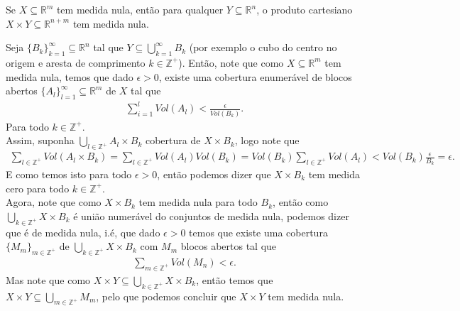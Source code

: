 \begin{homeworkProblem}[Seção 2-1]
  Se $X\subseteq \mathbb{R}^{m}$ tem medida nula, então para qualquer $Y\subseteq \mathbb{R}^{n}$, o produto cartesiano $X\times Y\subseteq \mathbb{R}^{n+m}$ tem medida nula. 
  \begin{solution}
    Seja $\{B_{k}\}_{k=1}^{\infty}\subseteq\mathbb{R}^{n}$ tal que $Y\subseteq \bigcup_{k=1}^{\infty}B_{k}$ (por exemplo o cubo do centro no origem e aresta de comprimento $k\in\mathbb{Z}^{+}$). Então, note que como $X\subseteq\mathbb{R}^{m}$ tem medida nula, temos que dado $\epsilon>0$, existe uma cobertura enumerável de blocos abertos $\{A_{l}\}_{l=1}^{\infty}\subseteq\mathbb{R}^{m}$ de $X$ tal que
    \begin{align*}
      \sum_{i=1}^{l}Vol(A_l)<\frac{\epsilon}{Vol(B_k)}.
    \end{align*}
    Para todo $k\in\mathbb{Z}^{+}$.\\
    Assim, suponha $\bigcup_{l\in\mathbb{Z}^{+}}A_l \times B_{k}$ cobertura de $X\times B_{k}$, logo note que
    \begin{align*}
      \sum_{l\in\mathbb{Z}^{+}}Vol(A_l\times B_k)=\sum_{l\in\mathbb{Z}^{+}}Vol(A_l)Vol(B_k)=Vol(B_k)\sum_{l\in\mathbb{Z}^{+}}Vol(A_l)<Vol(B_k)\frac{\epsilon}{B_k}=\epsilon.
    \end{align*}
    E como temos isto para todo $\epsilon>0$, então podemos dizer que $X\times B_k$ tem medida cero para todo $k\in\mathbb{Z}^{+}$.\\
    Agora, note que como $X\times B_{k}$ tem medida nula para todo $B_{k}$, então como $\bigcup_{k\in\mathbb{Z}^{+}}X\times B_k$ é união numerável do conjuntos de medida nula, podemos dizer que é de medida nula, i.é, que dado $\epsilon>0$ temos que existe uma cobertura $\{M_{m}\}_{m\in\mathbb{Z}^{+}}$ de $\bigcup_{k\in\mathbb{Z}^{+}}X\times B_{k}$ com $M_m$ blocos abertos tal que
    \begin{align*}
      \sum_{m\in\mathbb{Z}^{+}}Vol(M_n)<\epsilon.
    \end{align*}
    Mas note que como $X\times Y\subseteq \bigcup_{k\in\mathbb{Z}^{+}}X\times B_{k}$, então temos que $X\times Y\subseteq \bigcup_{m\in\mathbb{Z}^{+}}M_m$, pelo que podemos concluir que $X\times Y$ tem medida nula. 
  \end{solution}
\end{homeworkProblem}
